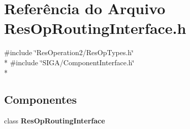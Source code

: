 \section{Referência do Arquivo Res\+Op\+Routing\+Interface.\+h}
\label{_res_op_routing_interface_8h}
{\ttfamily \#include \char`\"{}Res\+Operation2/\+Res\+Op\+Types.\+h\char`\"{}}\\*
{\ttfamily \#include \char`\"{}S\+I\+G\+A/\+Component\+Interface.\+h\char`\"{}}\\*
\subsection*{Componentes}
\begin{DoxyCompactItemize}
\item 
class {\bf Res\+Op\+Routing\+Interface}
\end{DoxyCompactItemize}
